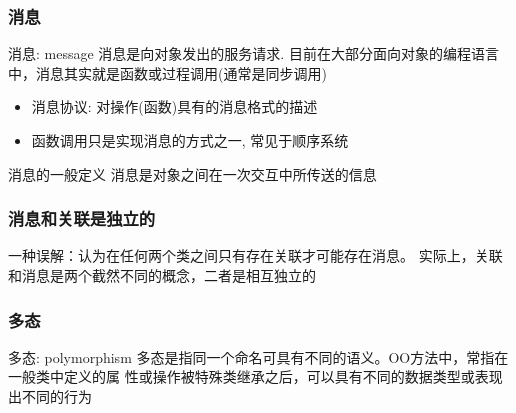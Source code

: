\documentclass[compress]{beamer}
\begin{document}
\begin{frame}
  \frametitle{消息}
  \begin{block}{消息: message}
    消息是向对象发出的服务请求.  目前在大部分面向对象的编程语言中，消息其实就是函数或过程调用(通常是同步调用)
    \begin{itemize}
      \item 消息协议: 对操作(函数)具有的消息格式的描述
      \item 函数调用只是实现消息的方式之一, 常见于顺序系统
    \end{itemize}
  \end{block}

  \begin{block}{消息的一般定义}
    消息是对象之间在一次交互中所传送的信息
  \end{block}
\end{frame}

\begin{frame}
  \frametitle{消息和关联是独立的}
  一种误解：认为在任何两个类之间只有存在关联才可能存在消息。
  实际上，关联和消息是两个截然不同的概念，二者是相互独立的 \\[2ex]

\end{frame}

\begin{frame}
  \frametitle{多态}

  \begin{block}{多态: polymorphism}
    多态是指同一个命名可具有不同的语义。OO方法中，常指在一般类中定义的属
    性或操作被特殊类继承之后，可以具有不同的数据类型或表现出不同的行为
  \end{block}

  \centering{}
\end{frame}
\end{document}
